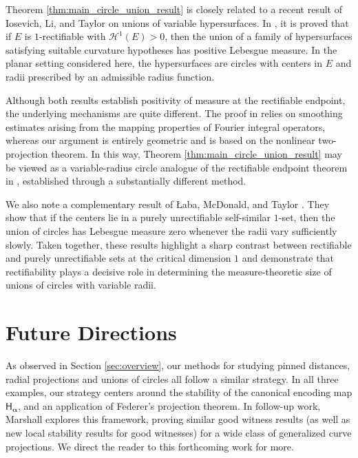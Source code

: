 \documentclass[12pt]{amsart}
\theoremstyle{definition}
\numberwithin{equation}{section}
\begin{document}
Theorem \ref{thm:main_circle_union_result} is closely related to a recent result of Iosevich, Li, and Taylor on unions of variable hypersurfaces. In \cite{ILT26}, it is proved that if $E$ is $1$-rectifiable with $\mathcal{H}^1(E)>0$, then the union of a family of hypersurfaces satisfying suitable curvature hypotheses has positive Lebesgue measure. In the planar setting considered here, the hypersurfaces are circles with centers in $E$ and radii prescribed by an admissible radius function.

Although both results establish positivity of measure at the rectifiable endpoint, the underlying mechanisms are quite different. The proof in \cite{ILT26} relies on smoothing estimates arising from the mapping properties of Fourier integral operators, whereas our argument is entirely geometric and is based on the nonlinear two-projection theorem.  In this way, Theorem \ref{thm:main_circle_union_result} may be viewed as a variable-radius circle analogue of the rectifiable endpoint theorem in \cite{ILT26}, established through a substantially different method.

We also note a complementary result of {\L}aba, McDonald, and Taylor \cite{LMT26}. They show that if the centers lie in a purely unrectifiable self-similar $1$-set, then the union of circles has Lebesgue measure zero whenever the radii vary sufficiently slowly. Taken together, these results highlight a sharp contrast between rectifiable and purely unrectifiable sets at the critical dimension $1$ and demonstrate that rectifiability plays a decisive role in determining the measure-theoretic size of unions of circles with variable radii.


\section*{Future Directions}
As observed in Section \ref{sec:overview}, our methods for studying pinned distances, radial projections and unions of circles all follow a similar strategy. In all three examples, our strategy centers around the stability of the canonical encoding map $\mathsf{H}_{\boldsymbol{\alpha}}$, and an application of Federer's projection theorem. In follow-up work, Marshall \cite{Marshall2026FiniteGoodWitnesses} explores this framework, proving similar good witness results (as well as new local stability results for good witnesses) for a wide class of generalized curve projections. We direct the reader to this forthcoming work for more.




                
\end{document}
